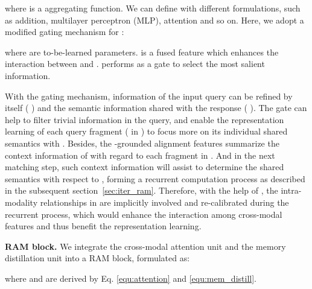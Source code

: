 \documentclass[10pt,twocolumn,letterpaper]{article}
\begin{document}
where  is a aggregating function. We can define  with different formulations, such as addition, multilayer perceptron (MLP), attention and so on. Here, we adopt a modified gating mechanism for :

where  are to-be-learned parameters.  is a fused feature which enhances the interaction between  and .  performs as a gate to select the most salient information.

With the gating mechanism, information of the input query can be refined by itself (\ie{} ) and the semantic information shared with the response (\ie{} ). The gate  can help to filter trivial information in the query, and enable the representation learning of each query fragment (\ie{}  in ) to focus more on its individual shared semantics with . Besides, the -grounded alignment features  summarize the context information of  with regard to each fragment in . And in the next matching step, such context information will assist to determine the shared semantics with respect to , forming a recurrent computation process as described in the subsequent section~\ref{sec:iter_ram}. Therefore, with the help of , the intra-modality relationships in  are implicitly involved and re-calibrated during the recurrent process, which would enhance the interaction among cross-modal features and thus benefit the representation learning.

\textbf{RAM block.} We integrate the cross-modal attention unit and the memory distillation unit into a RAM block, formulated as:

where  and  are derived by Eq. \ref{equ:attention} and \ref{equ:mem_distill}.
\end{document}
